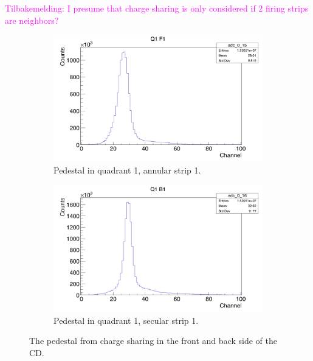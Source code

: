 \documentclass[twoside,english]{uiofysmaster/uiofysmaster}
\begin{document}
\textcolor{Magenta}{Tilbakemelding: \newline 
I presume that charge sharing is only considered if 2 firing strips are neighbors?
}


%
%
%

\begin{figure}[ht]
	\centering
	\begin{subfigure}{\textwidth}
		\centering
		\includegraphics[width=\textwidth]{../Plots/plotting/Pedestal_Q1_f1.png}
		\caption{Pedestal in quadrant 1, annular strip 1.}
		\label{fig:Pedestal_f}
	\end{subfigure}
	\begin{subfigure}{\textwidth}
		\centering
		\includegraphics[width=\textwidth]{../Plots/plotting/Pedestal_Q1_b1.png}
		\caption{Pedestal in quadrant 1, secular strip 1.}
		\label{fig:Pedestal_b}
	\end{subfigure}
	\caption{The pedestal from charge sharing in the front and back side of the CD.}
	\label{fig:Pedestal}
\end{figure}
\end{document}
